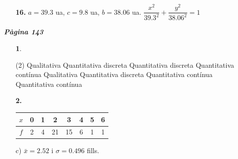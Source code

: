 \documentclass[a4paper, pdf, twoside]{book}
\begin{document}
\begin{multicols}{2}
\begin{enumerate}
\vspace{0.25cm}
\item[\fontfamily{phv}\selectfont\color{blue}\textbf{16. }]  \scalebox{0.6}{\simbolclau } 
$a=39.3$ ua, $c=9.8$ ua, $b=38.06$ ua. $\dfrac {x^2}{39.3^2}+\dfrac {y^2}{38.06^2}=1$
 \end{enumerate}
\vfill\null
\columnbreak
\def\currentname{Solucions del Tema 11}
\vspace*{0.75cm}

 

\vspace*{0.4cm}
 {}
\vspace{0.3cm}


{\textbf{\em Pàgina 143}} \hrulefill
\begin{enumerate}
\vspace{0.25cm}



 \item[\fontfamily{phv}\selectfont\color{blue}\textbf{1}. ] 
 \begin{tasks}[column-sep=1em, item-indent=1.3333em](2)
	 \task Qualitativa
	 \task Quantitativa discreta
	 \task Quantitativa discreta
	 \task Quantitativa contínua
	 \task Qualitativa
	 \task Quantitativa discreta
	 \task Quantitativa contínua
	 \task Quantitativa contínua
\end{tasks}
 \end{enumerate}
\begin{enumerate}
\vspace{0.25cm}
\item[\fontfamily{phv}\selectfont\color{blue}\textbf{2. }]  \scalebox{0.6}{\simbolclau } 
\begin {tabular}{c|c|c|c|c|c|c|c}\hline $x$ & 0 & 1 & 2 & 3 & 4 & 5 & 6 \\\hline $f$ & 2 &4 & 21 & 15 & 6 & 1 &1 \\ \end {tabular} \par c) $\bar x =2.52$ i $\sigma =0.496$ fills. 
 \end{enumerate}
\vspace{0.3cm}



\end{multicols}
\end{document}
